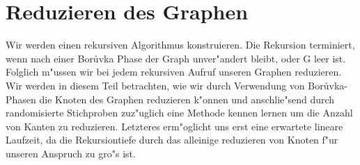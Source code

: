 \section{Reduzieren des Graphen}

Wir werden einen rekursiven Algorithmus konstruieren. 
    Die Rekursion terminiert, wenn nach einer Bor\r uvka Phase der Graph 
    unver"andert bleibt, oder G leer ist.
    Folglich m"ussen wir
    bei jedem rekursiven Aufruf unseren Graphen reduzieren. 
    Wir werden in 
    diesem Teil betrachten, wie wir durch Verwendung von Bor\r uvka-Phasen die
    Knoten des Graphen reduzieren k"onnen und anschlie"send durch randomisierte
    Stichproben zuz"uglich eine Methode kennen lernen um die Anzahl von Kanten
    zu reduzieren. 
    Letzteres erm"oglicht uns erst eine erwartete lineare 
    Laufzeit, da die Rekursiontiefe durch das alleinige reduzieren von Knoten
    f"ur unseren Anspruch zu gro"s ist.\\



